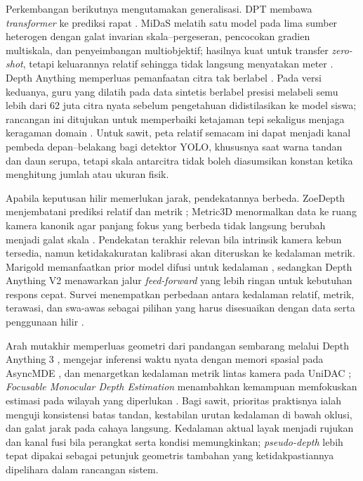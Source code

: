 Perkembangan berikutnya mengutamakan generalisasi. DPT membawa \textit{transformer} ke prediksi rapat \cite{ranftl2021dpt}. MiDaS melatih satu model pada lima sumber heterogen dengan galat invarian skala--pergeseran, pencocokan gradien multiskala, dan penyeimbangan multiobjektif; hasilnya kuat untuk transfer \textit{zero-shot}, tetapi keluarannya relatif sehingga tidak langsung menyatakan meter \cite{ranftl2022midas}. Depth Anything memperluas pemanfaatan citra tak berlabel \cite{yang2024depthanything}. Pada versi keduanya, guru yang dilatih pada data sintetis berlabel presisi melabeli semu lebih dari 62 juta citra nyata sebelum pengetahuan didistilasikan ke model siswa; rancangan ini ditujukan untuk memperbaiki ketajaman tepi sekaligus menjaga keragaman domain \cite{yang2024depthanythingv2}. Untuk sawit, peta relatif semacam ini dapat menjadi kanal pembeda depan--belakang bagi detektor YOLO, khususnya saat warna tandan dan daun serupa, tetapi skala antarcitra tidak boleh diasumsikan konstan ketika menghitung jumlah atau ukuran fisik.

Apabila keputusan hilir memerlukan jarak, pendekatannya berbeda. ZoeDepth menjembatani prediksi relatif dan metrik \cite{bhat2023zoedepth}; Metric3D menormalkan data ke ruang kamera kanonik agar panjang fokus yang berbeda tidak langsung berubah menjadi galat skala \cite{yin2023metric3d}. Pendekatan terakhir relevan bila intrinsik kamera kebun tersedia, namun ketidakakuratan kalibrasi akan diteruskan ke kedalaman metrik. Marigold memanfaatkan prior model difusi untuk kedalaman \cite{ke2024marigold}, sedangkan Depth Anything V2 menawarkan jalur \textit{feed-forward} yang lebih ringan untuk kebutuhan respons cepat. Survei menempatkan perbedaan antara kedalaman relatif, metrik, terawasi, dan swa-awas sebagai pilihan yang harus disesuaikan dengan data serta penggunaan hilir \cite{ming2021depthsurvey,zhang2025metricdepthsurvey}.

Arah mutakhir memperluas geometri dari pandangan sembarang melalui Depth Anything 3 \cite{lin2025depthanything3}, mengejar inferensi waktu nyata dengan memori spasial pada AsyncMDE \cite{ma2026asyncmde}, dan menargetkan kedalaman metrik lintas kamera pada UniDAC \cite{ganesan2026unidac}; \textit{Focusable Monocular Depth Estimation} menambahkan kemampuan memfokuskan estimasi pada wilayah yang diperlukan \cite{du2026focusabledepth}. Bagi sawit, prioritas praktisnya ialah menguji konsistensi batas tandan, kestabilan urutan kedalaman di bawah oklusi, dan galat jarak pada cahaya langsung. Kedalaman aktual layak menjadi rujukan dan kanal fusi bila perangkat serta kondisi memungkinkan; \textit{pseudo-depth} lebih tepat dipakai sebagai petunjuk geometris tambahan yang ketidakpastiannya dipelihara dalam rancangan sistem.

